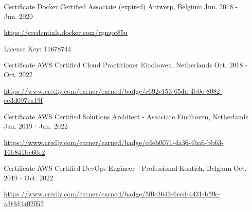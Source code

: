 

\begin{cventries}

  \cventry
    {Certificate} %
    {Docker Certified Associate (expired)} %
    {Antwerp, Belgium} %
    {Jun. 2018 - Jun. 2020} %
    {
      \begin{cvitems} %
        \item \url{https://credentials.docker.com/rgmpc85u}
        \item {License Key: 11678744}
      \end{cvitems}
    }

  \cventry
    {Certificate} %
    {AWS Certified Cloud Practitioner} %
    {Eindhoven, Netherlands} %
    {Oct. 2018 - Oct. 2022} %
    {
      \begin{cvitems} %
        \item \url{https://www.credly.com/earner/earned/badge/c692e153-65da-4b0c-8082-cc3d097ea19f}
      \end{cvitems}
    }

  \cventry
    {Certificate} %
    {AWS Certified Solutions Architect - Associate} %
    {Eindhoven, Netherlands} %
    {Jan. 2019 - Jan. 2022} %
    {
      \begin{cvitems} %
        \item \url{https://www.credly.com/earner/earned/badge/cdeb0071-4a36-4ba6-bb63-16b841be60e2}
      \end{cvitems}
    }

  \cventry
    {Certificate} %
    {AWS Certified DevOps Engineer - Professional} %
    {Kontich, Belgium} %
    {Oct. 2019 - Oct. 2022} %
    {
      \begin{cvitems} %
        \item \url{https://www.credly.com/earner/earned/badge/5f0c3643-6eed-4431-b59c-a3f4d4a02052}
      \end{cvitems}
    }


\end{cventries}
